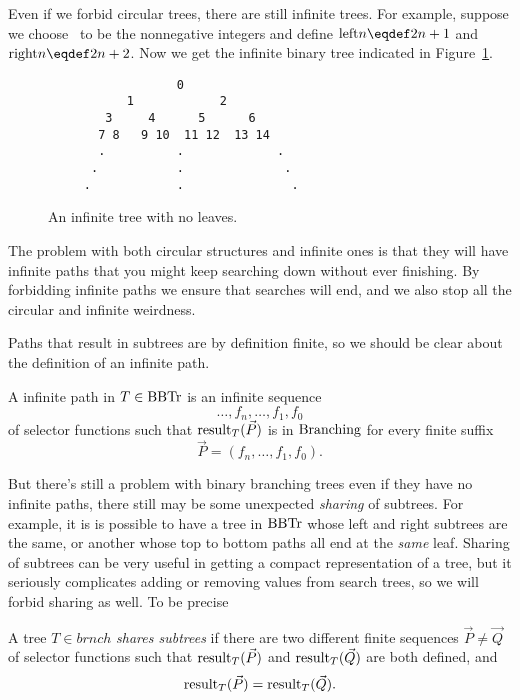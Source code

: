 \iffalse
For example, it is entirely
possible that there is a structure $T \in \brnch$ such that
\textcolor{red}{
\[
\leftsub{(T)} = T = \rightsub{(T)}.
\]}

This weird binary branching structure doesn't even have any leaves.
\fi

Even if we forbid circular trees, there are still infinite trees.  For
example, suppose we choose \brnch\ to be the nonnegative integers and
define $\leftsub{n} \eqdef 2n+1$ and $\rightsub{n} \eqdef 2n+2$.  Now
we get the infinite binary tree indicated in Figure~\ref{inftree123}.


\begin{figure}


\begin{verbatim}
                  0
           1            2
        3     4      5      6
       7 8   9 10  11 12  13 14
       .          .             . 
      .           .              .
     .            .               . 

\end{verbatim}

\caption{An infinite tree with no leaves.}

\label{inftree123}

\end{figure}

The problem with both circular structures and infinite ones is that
they will have infinite paths that you might keep searching down
without ever finishing.  By forbidding infinite paths we ensure that
searches will end, and we also stop all the circular and infinite
weirdness.

Paths that result in subtrees are by definition finite, so we should
be clear about the definition of an infinite path.

\begin{definition}
A infinite path in $T \in \brnch$ is an infinite sequence
\[
\dots,f_n,\dots,f_1,f_0
\]
of selector functions such that $\text{result}_{T}(\vec{P})$ is in $\text{Branching}$
for every finite suffix
\[
\vec{P} = (f_n,\dots, f_1,f_0).
\]
\end{definition}

But there's still a problem with binary branching trees even if they
have no infinite paths, there still may be some unexpected
\emph{sharing} of subtrees.  For example, it is is possible to have a
tree in $\text{BBTr}$ whose left and right subtrees are the same, or
another whose top to bottom paths all end at the \emph{same} leaf.
Sharing of subtrees can be very useful in getting a compact
representation of a tree, but it seriously complicates adding or
removing values from search trees, so we will forbid sharing as well.
To be precise
\begin{definition}
A tree $T \in brnch$ \emph{shares subtrees} if there are two different
finite sequences $\vec{P} \neq \vec{Q}$ of selector functions such that
$\text{result}_{T}(\vec{P})$ and $\text{result}_{T}(\vec{Q})$ are both defined, and
\[
\text{result}_{T}(\vec{P})=\text{result}_{T}(\vec{Q}).
\]
\end{definition}

